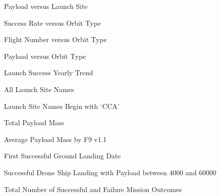\begin{frame}{Payload versus Launch Site}

\end{frame}

\begin{frame}{Success Rate versus Orbit Type}

\end{frame}

\begin{frame}{Flight Number versus Orbit Type}

\end{frame}

\begin{frame}{Payload versus Orbit Type}

\end{frame}

\begin{frame}{Launch Success Yearly Trend}

\end{frame}

\begin{frame}{All Launch Site Names}

\end{frame}

\begin{frame}{Launch Site Names Begin with `CCA'}

\end{frame}

\begin{frame}{Total Payload Mass}

\end{frame}

\begin{frame}{Average Payload Mass by F9 v1.1}

\end{frame}

\begin{frame}{First Successful Ground Landing Date}

\end{frame}

\begin{frame}{Successful Drone Ship Landing with Payload between 4000 and 60000}

\end{frame}

\begin{frame}{Total Number of Successful and Failure Mission Outcomes}

\end{frame}

